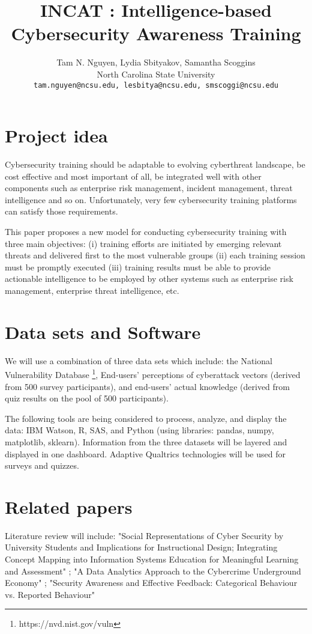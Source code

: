 \documentclass{article} %
\title{INCAT : Intelligence-based Cybersecurity Awareness Training}
\author{
Tam N. Nguyen, Lydia Sbityakov, Samantha Scoggins\\
North Carolina State University\\
\texttt{tam.nguyen@ncsu.edu, lesbitya@ncsu.edu, smscoggi@ncsu.edu} \\
}
\begin{document}
\maketitle

\section{Project idea}
Cybersecurity training should be adaptable to evolving cyberthreat landscape, be cost effective and most important of all, be integrated well with other components such as enterprise risk management, incident management, threat intelligence and so on. Unfortunately, very few cybersecurity training platforms can satisfy those requirements.

This paper proposes a new model for conducting cybersecurity training with three main objectives: (i) training efforts are initiated by emerging relevant threats and delivered first to the most vulnerable groups (ii) each training session must be
promptly executed (iii) training results must be able to provide actionable intelligence to be employed by other systems such as enterprise risk management, enterprise threat intelligence, etc.

\section{Data sets and Software}
We will use a combination of three data sets which include: the National Vulnerability Database \footnote{https://nvd.nist.gov/vuln}, End-users' perceptions of cyberattack vectors (derived from 500 survey participants), and end-users' actual knowledge (derived from quiz results on the pool of 500 participants).

The following tools are being considered to process, analyze, and display the data: IBM Watson, R, SAS, and Python (using libraries:  pandas, numpy, matplotlib, sklearn).  Information from the three datasets will be layered and displayed in one dashboard.  Adaptive Qualtrics technologies will be used for surveys and quizzes.

\section{Related papers}
Literature review will include: "Social Representations of Cyber Security by University Students and Implications for Instructional Design; Integrating Concept Mapping into Information Systems Education for Meaningful Learning and Assessment" ; "A Data Analytics Approach to the Cybercrime Underground Economy" ; "Security Awareness and Effective Feedback: Categorical Behaviour vs. Reported Behaviour"
\end{document}
